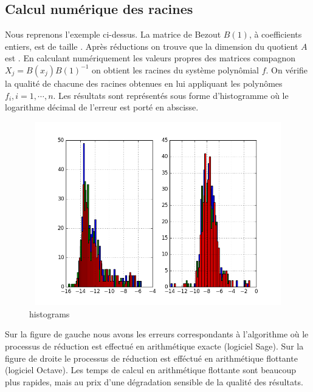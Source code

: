 \documentclass{standalone}
\begin{document}
  \subsection{Calcul numérique des racines}
  Nous reprenons l'exemple ci-dessus. La matrice de Bezout $B(1)$, à coefficients entiers, est de taille . Après réductions on trouve que la dimension du quotient $A$ est . En calculant numériquement les valeurs propres des matrices compagnon $X_j = B(x_j)B(1)^{-1}$ on obtient les racines du système polynômial $f$. On vérifie la qualité de chacune des racines obtenues en lui appliquant les polynômes $f_i, i=1,\cdots,n$. Les résultats sont représentés sous forme d'histogramme o\`u le logarithme décimal de l'erreur est porté en abscisse.
\begin{figure}[!ht]
  \includegraphics[height=8cm, width=1.2\textwidth]{../png/roots.png}
  \caption{histograms}
\end{figure}
Sur la figure de gauche nous avons les erreurs correspondants à l'algorithme o\`u le processus de réduction est effectué en arithmétique exacte (logiciel Sage). Sur la figure de droite le processus de réduction est efféctué en arithmétique flottante (logiciel Octave).
Les temps de calcul en arithmétique flottante sont beaucoup plus rapides, mais au prix d'une dégradation sensible de la qualité des résultats.
\end{document}
